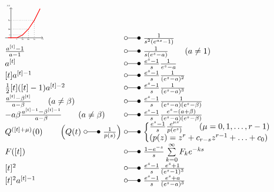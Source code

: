 \begin{footnotesize}
\[ \begin{array}{@{}l@{ ~ \laplace ~ }l@{}}
\begin{tikzpicture}[domain=0:5, scale=\graphtabscale, every node/.style={scale=\graphtabscale}]
    \draw[->] (-1,0) -- (5.5,0) node[below] {$t$};
    \draw[->] (0,-0.1) -- (0,5.2) node[above left] {$f(t)$};
    \draw[thick, red]
        (-0.5,0)
        --
        (1,0) node[below, black] {$a$}
        --
        (2,0.5)
        --
        (3,1.5)
        --
        (4,3)
        --
        (5,5);
    \draw[dotted] (0,0.5) node[left] {$ a$} -- (2,0.5) -- (2,0) node[below] {$2a$};
    \draw[dotted] (0,1.5) node[left] {$3a$} -- (3,1.5) -- (3,0) node[below] {$3a$};
    \draw[dotted] (0,3)   node[left] {$6a$} -- (4,3)   -- (4,0) node[below] {$4a$};
\end{tikzpicture} &
    \frac{1}{s^2 (e^{as} - 1)} \\
\frac{a^{[t]} - 1}{a - 1} &
    \frac{1}{s (e^s - a)} \qquad (a \neq 1) \\
a^{[t]} &
    \frac{e^s - 1}{s} \frac{1}{e^s - a} \\
\lbrack t \rbrack a^{[t] - 1} &
    \frac{e^s - 1}{s} \frac{1}{(e^s - a)^2} \\
\frac{1}{2} [t] ([t] - 1) a^{[t] - 2} &
    \frac{e^s - 1}{s} \frac{1}{(e^s - a)^3} \\
\frac{a^{[t]} - \beta^{[t]}}{a - \beta} \qquad (a \neq \beta) &
    \frac{e^s - 1}{s} \frac{1}{(e^s - a) (e^s - \beta)} \\
- a \beta \frac{a^{[t] - 1} - \beta^{[t] - 1}}{a - \beta} \qquad (a \neq \beta) &
    \frac{e^s - 1}{s} \frac{e^s - (a + \beta)}{(e^s - a) (e^s - \beta)} \\
Q^{([t] + \mu)} (0) \qquad \left(Q(t) ~ \laplace ~ \frac{1}{p(s)}\right) &
    \left\lbrace\begin{array}{@{}l@{}}
    \frac{e^s - 1}{s} \frac{e^{\mu s}}{p(e^s)} \qquad (\mu = 0, 1, \ldots, r - 1) \\
    (p(z) = z^r + c_{r - s} z^{r - 1} + \ldots + c_0) \\
    \end{array}\right. \\
F([t]) &
    \frac{1 - e^{-s}}{s} \sum\limits_{k=0}^{\infty} F_k e^{-ks} \\
{[t]^2} &
    \frac{e^s - 1}{s} \frac{e^s + 1}{(e^s - 1)^3} \\
{[t]^2} a^{[t] - 1} &
    \frac{e^s - 1}{s} \frac{e^s + a}{(e^s - a)^3} \\

\end{array}\]
\end{footnotesize}
